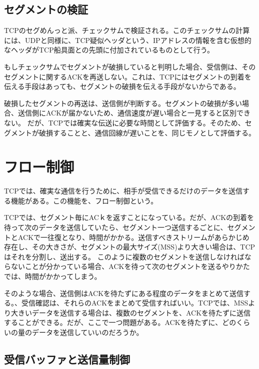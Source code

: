 \subsection{セグメントの検証}
TCPのセグめんっと派、チェックサムで検証される。このチェックサムの計算には、UDPと同様に、TCP疑似ヘッダという、IPアドレスの情報を含む仮想的なヘッダがTCP船具面との先頭に付加されているものとして行う。

もしチェックサムでセグメントが破損していると判明した場合、受信側は、そのセグメントに関するACKを再送しない。これは、TCPにはセグメントの到着を伝える手段はあっても、セグメントの破損を伝える手段がないからである。

破損したセグメントの再送は、送信側が判断する。セグメントの破損が多い場合、送信側にACKが届かないため、通信速度が遅い場合と一見すると区別できない。
だが、TCPでは確実な伝送に必要な時間として評価する。そのため、セグメントが破損することと、通信回線が遅いことを、同じモノとして評価する。


\section{フロー制御}

TCPでは、確実な通信を行うために、相手が受信できるだけのデータを送信する機能がある。この機能を、フロー制御という。

TCPでは、セグメント毎にACｋを返すことになっている。だが、ACKの到着を待って次のデータを送信していたら、セグメント一つ送信するごとに、セグメントとACKで一往復となり、時間がかかる。送信すべきストリームがあらかじめ存在し、その大きさが、セグメントの最大サイズ(MSS)より大きい場合は、TCPはそれを分割し、送出する。
このように複数のセグメントを送信しなければならないことが分かっている場合、ACKを待って次のセグメントを送るやりかたでは、時間がかかってしまう。

そのような場合、送信側はACKを待たずにある程度のデータをまとめて送信する。、受信確認は、それらのACKをまとめて受信すればいい。TCPでは、MSSより大きいデータを送信する場合は、複数のセグメントを、ACKを待たずに送信することができる。だが、ここで一つ問題がある。ACKを待たずに、どのくらいの量のデータを送信していいのだろうか。

\subsection{受信バッファと送信量制御}


